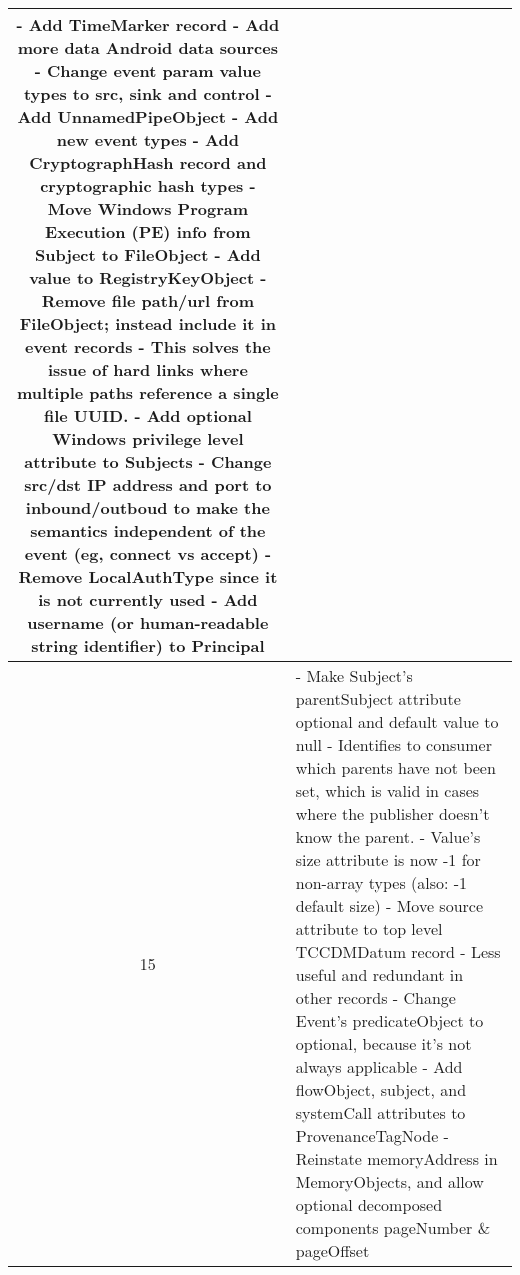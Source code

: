 \documentclass[10pt, conference, onecolumn]{IEEEtran}
\newcommand\tab[1][1em]{\hspace*{#1}}
\begin{document}
\begin{longtable}{|c|p{17cm}|}
  - Add TimeMarker record \newline
  - Add more data Android data sources \newline
  - Change event param value types to src, sink and control \newline
  - Add UnnamedPipeObject \newline
  - Add new event types \newline
  - Add CryptographHash record and cryptographic hash types \newline
  - Move Windows Program Execution (PE) info from Subject to FileObject \newline
  - Add value to RegistryKeyObject \newline
  - Remove file path/url from FileObject; instead include it in event records \newline
  \tab - This solves the issue of hard links where multiple paths reference a single file UUID. \newline
  - Add optional Windows privilege level attribute to Subjects \newline
  - Change src/dst IP address and port to inbound/outboud to make the semantics independent of the event (eg, connect vs accept) \newline
  - Remove LocalAuthType since it is not currently used \newline
  - Add username (or human-readable string identifier) to Principal \newline
\\\hline
15 & \small
  - Make Subject's parentSubject attribute optional and default value to null \newline
  \tab - Identifies to consumer which parents have not been set, which is valid in cases where the publisher doesn't know the parent. \newline
  - Value's size attribute is now -1 for non-array types (also: -1 default size) \newline
  - Move source attribute to top level TCCDMDatum record \newline
  \tab - Less useful and redundant in other records \newline
  - Change Event's predicateObject to optional, because it's not always applicable \newline
  - Add flowObject, subject, and systemCall attributes to ProvenanceTagNode \newline
  - Reinstate memoryAddress in MemoryObjects, and allow optional decomposed components pageNumber \& pageOffset \newline

\end{longtable}
\end{document}
